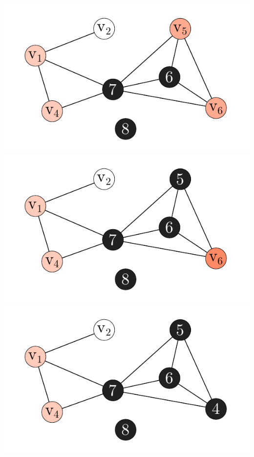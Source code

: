 \documentclass[xcolor=x11names,compress]{beamer}
\begin{document}
\begin{frame}
\begin{center}
\begin{overprint}
			\includegraphics[scale=1.0]{img/execution/mcs/04.pdf}
			\onslide<5>\includegraphics[scale=1.0]{img/execution/mcs/05.pdf}
			\onslide<6>\includegraphics[scale=1.0]{img/execution/mcs/06.pdf}

\end{overprint}
\end{center}
\end{frame}
\end{document}

